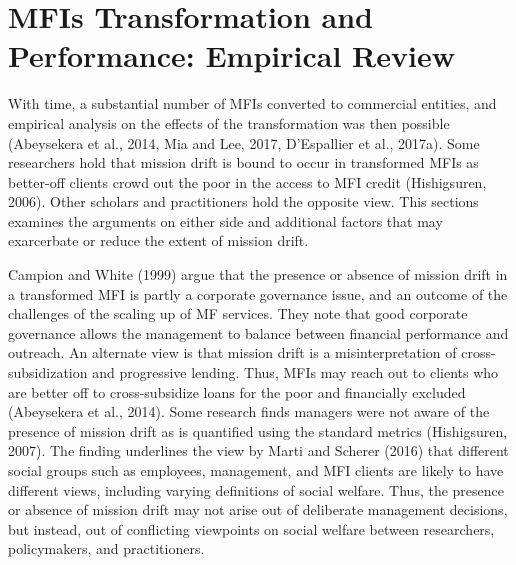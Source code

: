 \documentclass[a4paper, nobind]{templates/ociamthesis}
\begin{document}
\hypertarget{mfis-transformation-and-performance-empirical-review}{%
\section{MFIs Transformation and Performance: Empirical Review}\label{mfis-transformation-and-performance-empirical-review}}

\noindent With time, a substantial number of MFIs converted to commercial entities, and empirical analysis on the effects of the transformation was then possible (Abeysekera et al., 2014, Mia and Lee, 2017, D'Espallier et al., 2017a). Some researchers hold that mission drift is bound to occur in transformed MFIs as better-off clients crowd out the poor in the access to MFI credit (Hishigsuren, 2006). Other scholars and practitioners hold the opposite view. This sections examines the arguments on either side and additional factors that may exarcerbate or reduce the extent of mission drift.

Campion and White (1999) argue that the presence or absence of mission drift in a transformed MFI is partly a corporate governance issue, and an outcome of the challenges of the scaling up of MF services. They note that good corporate governance allows the management to balance between financial performance and outreach. An alternate view is that mission drift is a misinterpretation of cross-subsidization and progressive lending. Thus, MFIs may reach out to clients who are better off to cross-subsidize loans for the poor and financially excluded (Abeysekera et al., 2014). Some research finds managers were not aware of the presence of mission drift as is quantified using the standard metrics (Hishigsuren, 2007). The finding underlines the view by Marti and Scherer (2016) that different social groups such as employees, management, and MFI clients are likely to have different views, including varying definitions of social welfare. Thus, the presence or absence of mission drift may not arise out of deliberate management decisions, but instead, out of conflicting viewpoints on social welfare between researchers, policymakers, and practitioners.
\end{document}
